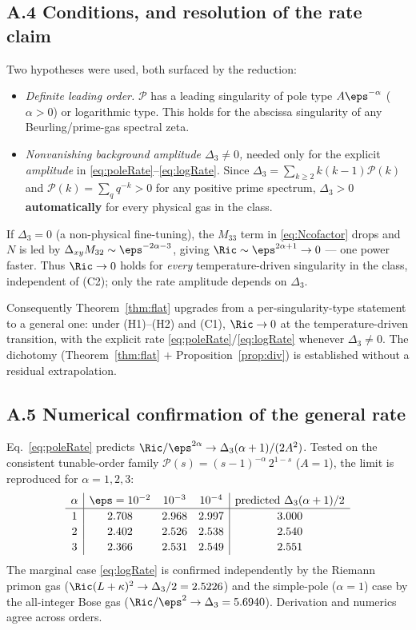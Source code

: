\subsection*{A.4 Conditions, and resolution of the rate claim}

Two hypotheses were used, both surfaced by the reduction:
\begin{itemize}
\item[(C1)] \emph{Definite leading order.} $\mathcal P$ has a leading singularity of pole type
$A\eps^{-\alpha}$ ($\alpha>0$) or logarithmic type. This holds for the abscissa singularity of any
Beurling/prime-gas spectral zeta.
\item[(C2)] \emph{Nonvanishing background amplitude $\Delta_3\ne0$,} needed only for the explicit
\emph{amplitude} in \eqref{eq:poleRate}--\eqref{eq:logRate}. Since
$\Delta_3=\sum_{k\ge2}k(k-1)\mathcal P(k)$ and $\mathcal P(k)=\sum_q q^{-k}>0$ for any positive
prime spectrum, $\Delta_3>0$ \textbf{automatically} for every physical gas in the class.
\end{itemize}

\begin{remark}\label{rem:uncond}
If $\Delta_3=0$ (a non-physical fine-tuning), the $M_{33}$ term in \eqref{eq:Ncofactor} drops and
$N$ is led by $\Delta_{xy}M_{32}\sim\eps^{-2\alpha-3}$, giving $\Ric\sim\eps^{2\alpha+1}\to0$ --- one
power faster. Thus $\Ric\to0$ holds for \emph{every} temperature-driven singularity in the class,
independent of (C2); only the rate amplitude depends on $\Delta_3$.
\end{remark}

Consequently Theorem~\ref{thm:flat} upgrades from a per-singularity-type statement to a general
one: under (H1)--(H2) and (C1), $\Ric\to0$ at the temperature-driven transition, with the explicit
rate \eqref{eq:poleRate}/\eqref{eq:logRate} whenever $\Delta_3\ne0$. The dichotomy
(Theorem~\ref{thm:flat} $+$ Proposition~\ref{prop:div}) is established without a residual
extrapolation.

\subsection*{A.5 Numerical confirmation of the general rate}

Eq.~\eqref{eq:poleRate} predicts $\Ric/\eps^{2\alpha}\to\Delta_3(\alpha+1)/(2A^2)$. Tested on the
consistent tunable-order family $\mathcal P(s)=(s-1)^{-\alpha}\,2^{1-s}$ ($A=1$), the limit is
reproduced for $\alpha=1,2,3$:
\[
\renewcommand{\arraystretch}{1.15}
\begin{array}{c|ccc|c}
\alpha & \eps=10^{-2} & 10^{-3} & 10^{-4} & \text{predicted }\Delta_3(\alpha+1)/2\\\hline
1 & 2.708 & 2.968 & 2.997 & 3.000\\
2 & 2.402 & 2.526 & 2.538 & 2.540\\
3 & 2.366 & 2.531 & 2.549 & 2.551
\end{array}
\]
The marginal case \eqref{eq:logRate} is confirmed independently by the Riemann primon gas
($\Ric(L+\kappa)^2\to\Delta_3/2=2.5226$) and the simple-pole ($\alpha=1$) case by the all-integer
Bose gas ($\Ric/\eps^2\to\Delta_3=5.6940$). Derivation and numerics agree across orders.
